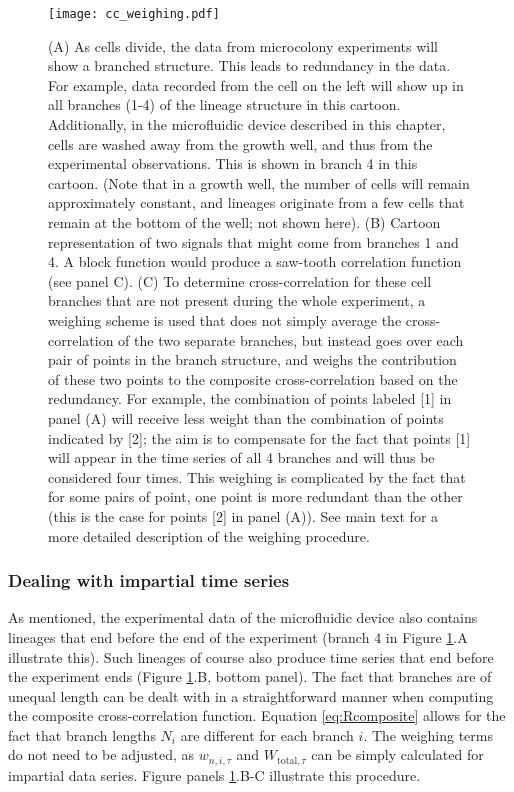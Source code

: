 {\begin{figure}
	\centering
	\texttt{[image: cc\_weighing.pdf]}
	\caption{ 
		(A) As cells divide, the data from microcolony experiments will show a branched structure. 
		This leads to redundancy in the data. 
		For example, data recorded from the cell on the left will show up in all branches (1-4) of the lineage structure in this cartoon.
		Additionally, in the microfluidic device described in this chapter, cells are washed away from the growth well, and thus from the experimental observations. 
		This is shown in branch 4 in this cartoon.
		(Note that in a growth well, the number of cells will remain approximately constant, 
		and lineages originate from a few cells that remain at the bottom of the well; not shown here).
		(B) Cartoon representation of two signals that might come from branches 1 and 4. A block function would produce a saw-tooth correlation function (see panel C).
		(C) To determine cross-correlation for these cell branches that are not present during the whole experiment, a weighing scheme is used that does not simply average the cross-correlation of the two separate branches, but instead goes over each pair of points in the branch structure, and weighs the contribution of these two points to the composite cross-correlation based on the redundancy. 
		For example, the combination of points labeled [1] in panel (A) will receive less weight than the combination of points indicated by [2]; the aim is to compensate for the fact that points [1] will appear in the time series of all 4 branches and will thus be considered four times.
		This weighing is complicated by the fact that for some pairs of point, one point is more redundant than the other (this is the case for points [2] in panel (A)). See main text for a more detailed description of the weighing procedure.
	}
	\label{fig:mm:weighingCCs}
\end{figure}

\subsubsection{Dealing with impartial time series}

As mentioned, the experimental data of the microfluidic device also contains lineages that end before the end of the experiment (branch 4 in Figure \ref{fig:mm:weighingCCs}.A illustrate this).
%
Such lineages of course also produce time series that end before the experiment ends (Figure \ref{fig:mm:weighingCCs}.B, bottom panel).
%
The fact that branches are of unequal length can be dealt with in a straightforward manner when computing the composite cross-correlation function.
%
Equation \ref{eq:Rcomposite} allows for the fact that branch lengths $N_i$ are different for each branch $i$. 
%
The weighing terms do not need to be adjusted, as 
$w_{n,i,\tau}$ and $W_{\text{total},\tau}$
can be simply calculated for impartial data series.
%
Figure panels \ref{fig:mm:weighingCCs}.B-C illustrate this procedure.

}

